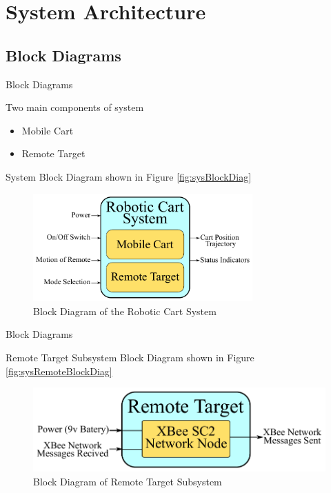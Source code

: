 \documentclass{beamer}
\begin{document}

\section{System Architecture}
\subsection{Block Diagrams}
\begin{frame}{Block Diagrams}
  \begin{block}{}
    Two main components of system
    \begin{itemize}
      \item Mobile Cart
      \item Remote Target
    \end{itemize}
    System Block Diagram shown in Figure \autoref{fig:sysBlockDiag}
  \end{block}
  \begin{figure}[b]
    \centering
    \includegraphics[width=0.75\textwidth]{figs/system_block_diagram_2}
    \caption{Block Diagram of the Robotic Cart System}
    \label{fig:sysBlockDiag}
  \end{figure}
\end{frame}

\begin{frame}{Block Diagrams}
  \begin{block}{}
    Remote Target Subsystem Block Diagram shown in Figure \autoref{fig:sysRemoteBlockDiag}
  \end{block}
  \begin{figure}[b]
    \centering
    \includegraphics[width=\textwidth]{figs/remote_target_block_diagram}
    \caption{Block Diagram of Remote Target Subsystem}
    \label{fig:sysRemoteBlockDiag}
  \end{figure}
\end{frame}
\end{document}
